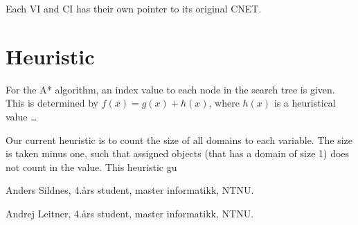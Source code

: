 \documentclass[journal]{IEEEtran}
\begin{document}
Each VI and CI has their own pointer to its original CNET.

\section{Heuristic}
For the A* algorithm, an index value to each node in the search tree is given.
This is determined by $f(x) = g(x) + h(x)$, where $h(x)$ is a heuristical value \dots

Our current heuristic is to count the size of all domains to each variable.
The size is taken minus one, such that assigned objects (that has a domain
of size 1) does not count in the value. This heuristic gu

\begin{IEEEbiographynophoto}{Anders Sildnes,}
    4.års student, master informatikk, NTNU.\
\end{IEEEbiographynophoto}
\begin{IEEEbiographynophoto}{Andrej Leitner,}
    4.års student, master informatikk, NTNU.\
\end{IEEEbiographynophoto}

    
%
%
%
%
%
% 
\end{document}
